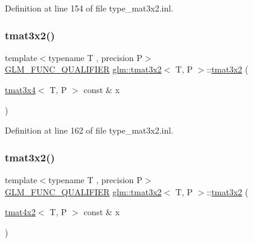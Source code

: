 Definition at line 154 of file type\+\_\+mat3x2.\+inl.

\mbox{\label{structglm_1_1tmat3x2_af2e7c96eb468f302bc3b90dbc41e62d7}} 
\subsubsection{\texorpdfstring{tmat3x2()}{tmat3x2()}\hspace{0.1cm}{\footnotesize\ttfamily [16/22]}}
{\footnotesize\ttfamily template$<$typename T , precision P$>$ \\
\mbox{\hyperlink{setup_8hpp_a33fdea6f91c5f834105f7415e2a64407}{G\+L\+M\+\_\+\+F\+U\+N\+C\+\_\+\+Q\+U\+A\+L\+I\+F\+I\+ER}} \mbox{\hyperlink{structglm_1_1tmat3x2}{glm\+::tmat3x2}}$<$ T, P $>$\+::\mbox{\hyperlink{structglm_1_1tmat3x2}{tmat3x2}} (\begin{DoxyParamCaption}\item[{\mbox{\hyperlink{structglm_1_1tmat3x4}{tmat3x4}}$<$ T, P $>$ const \&}]{x }\end{DoxyParamCaption})}



Definition at line 162 of file type\+\_\+mat3x2.\+inl.

\mbox{\label{structglm_1_1tmat3x2_aa157cfdb7cf64c70765e4421dac9e4c1}} 
\subsubsection{\texorpdfstring{tmat3x2()}{tmat3x2()}\hspace{0.1cm}{\footnotesize\ttfamily [17/22]}}
{\footnotesize\ttfamily template$<$typename T , precision P$>$ \\
\mbox{\hyperlink{setup_8hpp_a33fdea6f91c5f834105f7415e2a64407}{G\+L\+M\+\_\+\+F\+U\+N\+C\+\_\+\+Q\+U\+A\+L\+I\+F\+I\+ER}} \mbox{\hyperlink{structglm_1_1tmat3x2}{glm\+::tmat3x2}}$<$ T, P $>$\+::\mbox{\hyperlink{structglm_1_1tmat3x2}{tmat3x2}} (\begin{DoxyParamCaption}\item[{\mbox{\hyperlink{structglm_1_1tmat4x2}{tmat4x2}}$<$ T, P $>$ const \&}]{x }\end{DoxyParamCaption})}



